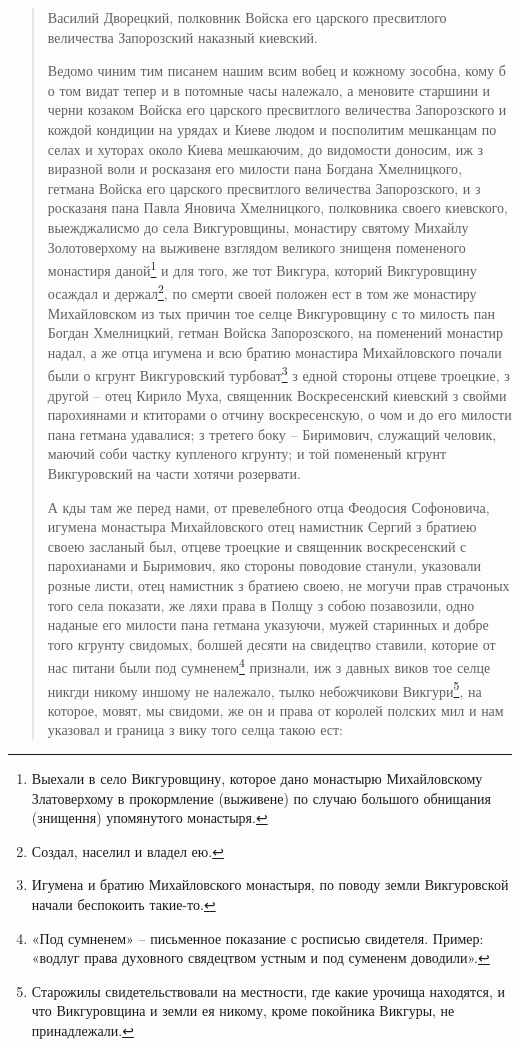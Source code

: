 \begin{quotation}
Василий Дворецкий, полковник Войска его царского пресвитлого величества Запорозский наказный киевский.

Ведомо чиним тим писанем нашим всим вобец и кожному зособна, кому б о том видат тепер и в потомные часы належало, а меновите старшини и черни козаком Войска его царского пресвитлого величества Запорозского и кождой кондиции на урядах и Киеве людом и посполитим мешканцам по селах и хуторах около Киева мешкаючим, до видомости доносим, иж з виразной воли и росказаня его милости пана Богдана Хмелницкого, гетмана Войска его царского пресвитлого величества Запорозского, и з росказаня пана Павла Яновича Хмелницкого, полковника своего киевского, выежджалисмо до села Викгуровщины, монастиру святому Михайлу Золотоверхому на выживене взглядом великого знищеня помененого монастиря даной\footnote{Выехали в село Викгуровщину, которое дано монастырю Михайловскому Златоверхому в прокормление (выживене) по случаю большого обнищания (знищення) упомянутого монастыря.} и для того, же тот Викгура, которий Викгуровщину осаждал и держал\footnote{Создал, населил и владел ею.}, по смерти своей положен ест в том же монастиру Михайловском из тых причин тое селце Викгуровщину с то милость пан Богдан Хмелницкий, гетман Войска Запорозского, на поменений монастир надал, а же отца игумена и всю братию монастира Михайловского почали были о кгрунт Викгуровский турбоват\footnote{Игумена и братию Михайловского монастыря, по поводу земли Викгуровской начали беспокоить такие-то.} з едной стороны отцеве троецкие, з другой – отец Кирило Муха, священник Воскресенский киевский з свойми парохиянами и ктиторами о отчину воскресенскую, о чом и до его милости пана гетмана удавалися; з третего боку – Биримович, служащий человик, маючий соби частку купленого кгрунту; и той помененый кгрунт Викгуровский на части хотячи розервати.

А кды там же перед нами, от превелебного отца Феодосия Софоновича, игумена монастыра Михайловского отец намистник Сергий з братиею своею засланый был, отцеве троецкие и священник воскресенский с парохианами и Быримович, яко стороны поводовие станули, указовали розные листи, отец намистник з братиею своею, не могучи прав страчоных того села показати, же ляхи права в Полщу з собою позавозили, одно наданые его милости пана гетмана указуючи, мужей старинных и добре того кгрунту свидомых, болшей десяти на свидецтво ставили, которие от нас питани были под сумненем\footnote{«Под сумненем» – письменное показание с росписью свидетеля. Пример: «водлуг права духовного свядецтвом устным и под сумененм доводили».} признали, иж з давных виков тое селце никгди никому иншому не належало, тылко небожчикови Викгури\footnote{Старожилы свидетельствовали на местности, где какие урочища находятся, и что Викгуровщина и земли ея никому, кроме покойника Викгуры, не принадлежали.}, на которое, мовят, мы свидоми, же он и права от королей полских мил и нам указовал и граница з вику того селца такою ест:


\end{quotation}
